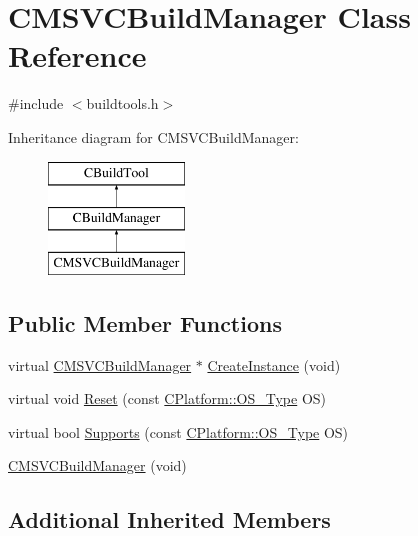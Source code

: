 \hypertarget{classCMSVCBuildManager}{\section{C\-M\-S\-V\-C\-Build\-Manager Class Reference}
\label{classCMSVCBuildManager}
}


{\ttfamily \#include $<$buildtools.\-h$>$}

Inheritance diagram for C\-M\-S\-V\-C\-Build\-Manager\-:\begin{figure}[H]
\begin{center}
\leavevmode
\includegraphics[height=3.000000cm]{df/d06/classCMSVCBuildManager}
\end{center}
\end{figure}
\subsection*{Public Member Functions}
\begin{DoxyCompactItemize}
\item 
virtual \hyperlink{classCMSVCBuildManager}{C\-M\-S\-V\-C\-Build\-Manager} $\ast$ \hyperlink{classCMSVCBuildManager_a2519f0cd2477b6f9bd4459b15635c466}{Create\-Instance} (void)
\item 
virtual void \hyperlink{classCMSVCBuildManager_a1ca4f16c93948c195a65d14746555bea}{Reset} (const \hyperlink{classCPlatform_a2fb735c63c53052f79629e338bb0f535}{C\-Platform\-::\-O\-S\-\_\-\-Type} O\-S)
\item 
virtual bool \hyperlink{classCMSVCBuildManager_a3cbaed658bc22c79e3e7773dfa160539}{Supports} (const \hyperlink{classCPlatform_a2fb735c63c53052f79629e338bb0f535}{C\-Platform\-::\-O\-S\-\_\-\-Type} O\-S)
\item 
\hyperlink{classCMSVCBuildManager_a19ae07c6d18f6a668736cdaf806eeaae}{C\-M\-S\-V\-C\-Build\-Manager} (void)
\end{DoxyCompactItemize}
\subsection*{Additional Inherited Members}


